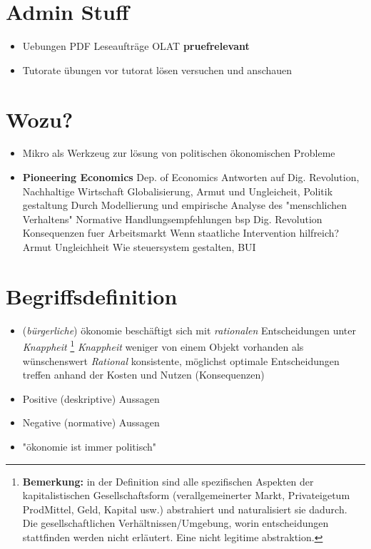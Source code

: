 
\section{Admin Stuff}
\begin{itemize}
    \item Uebungen
        \subitem PDF Leseaufträge OLAT \textbf{pruefrelevant} 
    \item Tutorate
        \subitem übungen vor tutorat lösen versuchen und anschauen 
\end{itemize}

\section{Wozu?}
\begin{itemize}
    \item Mikro als Werkzeug zur lösung von politischen ökonomischen Probleme
    \item \textbf{Pioneering Economics} Dep. of Economics
    \subitem Antworten auf Dig. Revolution, Nachhaltige Wirtschaft Globalisierung, Armut und Ungleicheit, Politik gestaltung
    \subitem Durch Modellierung und empirische Analyse des "menschlichen Verhaltens"
    \subitem Normative Handlungsempfehlungen
    \subitem bsp Dig. Revolution
    \subsubitem Konsequenzen fuer Arbeitsmarkt
    \subsubitem Wenn staatliche Intervention hilfreich?
    \subitem Armut Ungleichheit
    \subsubitem Wie steuersystem gestalten, BUI
\end{itemize}

\section{Begriffsdefinition}
\begin{itemize}
    \item (\textit{bürgerliche}) ökonomie beschäftigt sich mit \textit{rationalen} Entscheidungen unter \textit{Knappheit} 
    \footnote{\textbf{Bemerkung:} in der Definition sind alle spezifischen Aspekten der kapitalistischen Gesellschaftsform (verallgemeinerter Markt, Privateigetum ProdMittel, Geld, Kapital usw.) abstrahiert und naturalisiert sie dadurch. Die gesellschaftlichen Verhältnissen/Umgebung, worin entscheidungen stattfinden werden nicht erläutert. Eine nicht legitime abstraktion.}
    \subitem \textit{Knappheit} weniger von einem Objekt vorhanden als wünschenswert
    \subitem \textit{Rational} konsistente, möglichst optimale Entscheidungen treffen anhand der Kosten und Nutzen (Konsequenzen) 
    \item Positive (deskriptive) Aussagen
    \item Negative (normative) Aussagen 
    \item "ökonomie ist immer politisch"
\end{itemize}

